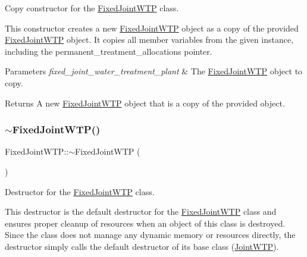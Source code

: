 Copy constructor for the \mbox{\hyperlink{classFixedJointWTP}{Fixed\+Joint\+W\+TP}} class. 

This constructor creates a new {\ttfamily \mbox{\hyperlink{classFixedJointWTP}{Fixed\+Joint\+W\+TP}}} object as a copy of the provided {\ttfamily \mbox{\hyperlink{classFixedJointWTP}{Fixed\+Joint\+W\+TP}}} object. It copies all member variables from the given instance, including the {\ttfamily permanent\+\_\+treatment\+\_\+allocations} pointer.


\begin{DoxyParams}{Parameters}
{\em fixed\+\_\+joint\+\_\+water\+\_\+treatment\+\_\+plant} & The {\ttfamily \mbox{\hyperlink{classFixedJointWTP}{Fixed\+Joint\+W\+TP}}} object to copy.\\
\hline
\end{DoxyParams}
\begin{DoxyReturn}{Returns}
A new {\ttfamily \mbox{\hyperlink{classFixedJointWTP}{Fixed\+Joint\+W\+TP}}} object that is a copy of the provided object. 
\end{DoxyReturn}
\mbox{\label{classFixedJointWTP_a9c42b1420843421c045feeb489b07b95}} 
\subsubsection{\texorpdfstring{$\sim$\+Fixed\+Joint\+W\+T\+P()}{~FixedJointWTP()}}
{\footnotesize\ttfamily Fixed\+Joint\+W\+T\+P\+::$\sim$\+Fixed\+Joint\+W\+TP (\begin{DoxyParamCaption}{ }\end{DoxyParamCaption})\hspace{0.3cm}{\ttfamily [override]}}



Destructor for the \mbox{\hyperlink{classFixedJointWTP}{Fixed\+Joint\+W\+TP}} class. 

This destructor is the default destructor for the {\ttfamily \mbox{\hyperlink{classFixedJointWTP}{Fixed\+Joint\+W\+TP}}} class and ensures proper cleanup of resources when an object of this class is destroyed. Since the class does not manage any dynamic memory or resources directly, the destructor simply calls the default destructor of its base class ({\ttfamily \mbox{\hyperlink{classJointWTP}{Joint\+W\+TP}}}).

